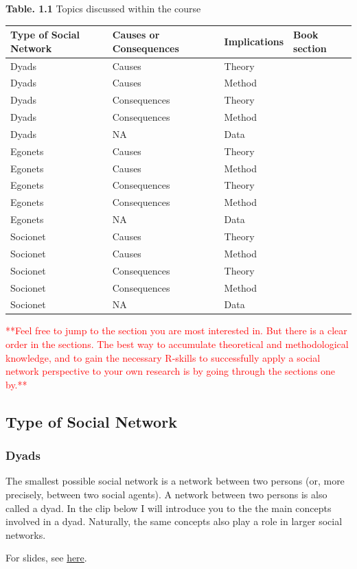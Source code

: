 \documentclass[
]{book}
\begin{document}
\textbf{Table. 1.1 } Topics discussed within the course

\begin{longtable}[]{@{}llll@{}}
\toprule
Type of Social Network & Causes or Consequences & Implications & Book section\tabularnewline
\midrule
\endhead
Dyads & Causes & Theory &\tabularnewline
Dyads & Causes & Method &\tabularnewline
Dyads & Consequences & Theory &\tabularnewline
Dyads & Consequences & Method &\tabularnewline
Dyads & NA & Data &\tabularnewline
Egonets & Causes & Theory &\tabularnewline
Egonets & Causes & Method &\tabularnewline
Egonets & Consequences & Theory &\tabularnewline
Egonets & Consequences & Method &\tabularnewline
Egonets & NA & Data &\tabularnewline
Socionet & Causes & Theory &\tabularnewline
Socionet & Causes & Method &\tabularnewline
Socionet & Consequences & Theory &\tabularnewline
Socionet & Consequences & Method &\tabularnewline
Socionet & NA & Data &\tabularnewline
\bottomrule
\end{longtable}

\textcolor{red}{**Feel free to jump to the section you are most interested in. But there is a clear order in the sections. The best way to accumulate theoretical and methodological knowledge, and to gain the necessary R-skills to successfully apply a social network perspective to your own research is by going through the sections one by.**}

\hypertarget{type-of-social-network}{%
\subsection{Type of Social Network}\label{type-of-social-network}}

\hypertarget{dyads}{%
\subsubsection*{\texorpdfstring{\textbf{Dyads}}{Dyads}}\label{dyads}}

The smallest possible social network is a network between two persons (or, more precisely, between two social agents). A network between two persons is also called a dyad. In the clip below I will introduce you to the the main concepts involved in a dyad. Naturally, the same concepts also play a role in larger social networks.

For slides, see \href{dyads.pdf}{here}.
\end{document}
